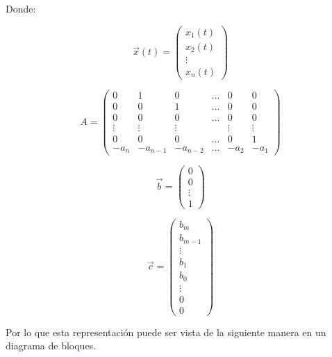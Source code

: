     Donde:

    \begin{equation}
        \vec{x}(t) =
        \begin{pmatrix}
        x_1(t) \\
        x_2(t) \\
        \vdots \\
        x_n(t)
        \end{pmatrix}
    \end{equation}

    \begin{equation}
        A =
        \begin{pmatrix}
        0 & 1 & 0 & \dots & 0 & 0 \\
        0 & 0 & 1 & \dots & 0 & 0 \\
        0 & 0 & 0 & \dots & 0 & 0 \\
        \vdots & \vdots & \vdots &   & \vdots & \vdots \\
        0 & 0 & 0 & \dots & 0 & 1 \\
        -a_n & -a_{n-1} & -a_{n-2} & \dots & -a_2 & -a_1
        \end{pmatrix}
    \end{equation}

    \begin{equation}
        \vec{b} =
        \begin{pmatrix}
        0 \\
        0 \\
        \vdots \\
        1
        \end{pmatrix}
    \end{equation}

    \begin{equation}
        \vec{c} =
        \begin{pmatrix}
        b_m     \\
        b_{m-1} \\
        \vdots  \\
        b_1     \\
        b_0     \\
        \vdots  \\
        0       \\
        0
        \end{pmatrix}
    \end{equation}

    Por lo que esta representación puede ser vista de la siguiente manera en un diagrama de bloques.

